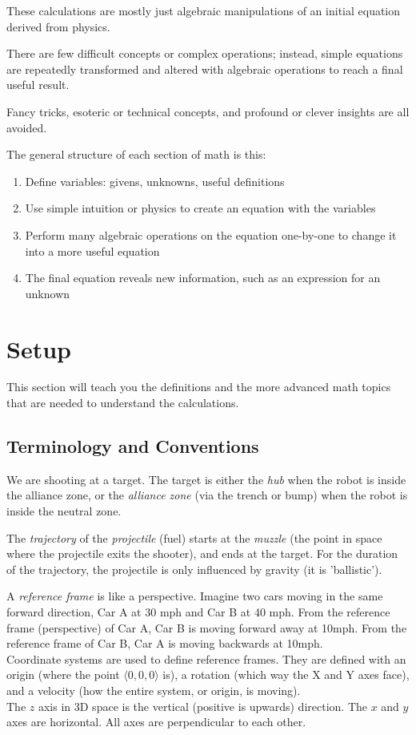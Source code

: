 \documentclass{article}
\begin{document}
These calculations are mostly just algebraic manipulations of an initial equation derived from physics.

There are few difficult concepts or complex operations; instead, simple equations are repeatedly transformed and altered with algebraic operations to reach a final useful result.

Fancy tricks, esoteric or technical concepts, and profound or clever insights are all avoided.

The general structure of each section of math is this:
\begin{enumerate}
    \item Define variables: givens, unknowns, useful definitions
    \item Use simple intuition or physics to create an equation with the variables
    \item Perform many algebraic operations on the equation one-by-one to change it into a more useful equation
    \item The final equation reveals new information, such as an expression for an unknown
\end{enumerate}

\section*{Setup}
This section will teach you the definitions and the more advanced math topics that are needed to understand the calculations.

\subsection*{Terminology and Conventions}
We are shooting at a target. The target is either the \textit{hub} when the robot is inside the alliance zone, or the \textit{alliance zone} (via the trench or bump) when the robot is inside the neutral zone.

The \textit{trajectory} of the \textit{projectile} (fuel) starts at the \textit{muzzle} (the point in space where the projectile exits the shooter), and ends at the target. For the duration of the trajectory, the projectile is only influenced by gravity (it is 'ballistic').

A \textit{reference frame} is like a perspective. Imagine two cars moving in the same forward direction, Car A at 30 mph and Car B at 40 mph. From the reference frame (perspective) of Car A, Car B is moving forward away at 10mph. From the reference frame of Car B, Car A is moving backwards at 10mph. \\
Coordinate systems are used to define reference frames. They are defined with an origin (where the point $\langle0,0,0\rangle$ is), a rotation (which way the X and Y axes face), and a velocity (how the entire system, or origin, is moving). \\
The $z$ axis in 3D space is the vertical (positive is upwards) direction. The $x$ and $y$ axes are horizontal. All axes are perpendicular to each other.
\end{document}
